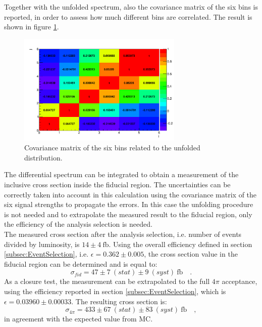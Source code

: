 Together with the unfolded spectrum, also the covariance matrix of the six bins is reported, in order to assess how much different bins are correlated. The result is shown in figure \ref{fig:cov_kreg3}.
\begin{figure}[htb]
\centering
\includegraphics[width=0.7\textwidth]{images/plotsPreApp/covariance_kreg3.pdf}
\caption{Covariance matrix of the six \pth bins related to the unfolded distribution.\label{fig:cov_kreg3}}
\end{figure} 

The differential spectrum can be integrated to obtain a measurement of the inclusive cross section inside the fiducial region. The uncertainties can be correctly taken into account in this calculation using the covariance matrix of the six signal strengths to propagate the errors. In this case the unfolding procedure is not needed and to extrapolate the measured result to the fiducial region, only the efficiency of the analysis selection is needed.\\
 
The measured cross section after the analysis selection, i.e. number of events divided by luminosity, is $14 \pm 4~\mathrm{fb}$.
Using the overall efficiency defined in section \ref{subsec:EventSelection}, i.e. $\epsilon=0.362\pm{0.005}$, the cross section value in the fiducial region can be determined and is equal to:
\begin{equation}
\sigma_{fid} = 47\pm 7~(stat) \pm 9~(syst)~\mathrm{fb} \quad .
\end{equation}
As a closure test, the measurement can be extrapolated to the full $4\pi$ acceptance, using the efficiency reported in section \ref{subsec:EventSelection}, which is $\epsilon=0.03960\pm{0.00033}$.
The resulting cross section is:
\begin{equation}
\sigma_{4\pi} = 433 \pm 67~(stat) \pm 83~(syst)~\mathrm{fb} \quad ,
\end{equation}
in agreement with the expected value from MC.

